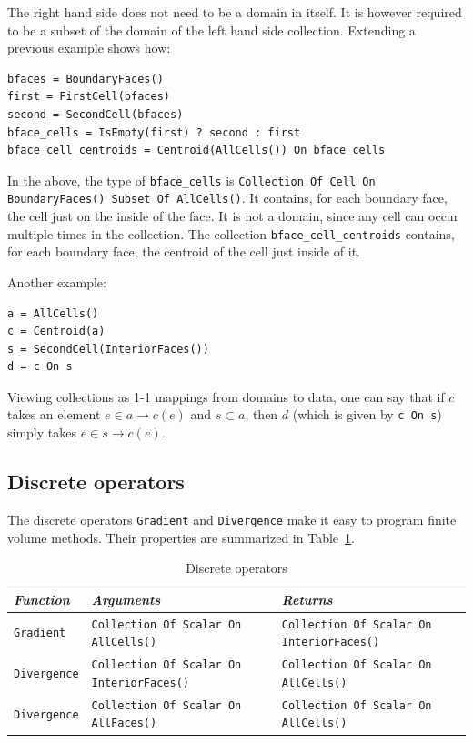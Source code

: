 \documentclass[11pt]{article}
\newcommand{\code}[1]{\texttt{#1}}
\begin{document}
The right hand side does not need to be a domain in itself. It is however required to be a subset of
the domain of the left hand side collection. Extending a previous example shows how:

\begin{verbatim}
bfaces = BoundaryFaces()
first = FirstCell(bfaces)
second = SecondCell(bfaces)
bface_cells = IsEmpty(first) ? second : first
bface_cell_centroids = Centroid(AllCells()) On bface_cells
\end{verbatim}

In the above, the type of \code{bface\_cells} is \code{Collection Of Cell On
  BoundaryFaces() Subset Of AllCells()}. It contains, for each boundary face, the cell
just on the inside of the face. It is not a domain, since any cell can occur multiple
times in the collection. The collection \code{bface\_cell\_centroids} contains, for each
boundary face, the centroid of the cell just inside of it.

Another example:

\begin{verbatim}
a = AllCells()
c = Centroid(a)
s = SecondCell(InteriorFaces())
d = c On s
\end{verbatim}


Viewing collections as 1-1 mappings from domains to data, one can say that if $c$ takes an
element $e \in a \to c(e)$ and $s \subset a$, then $d$ (which is given by \code{c On s})
simply takes $e \in s \to c(e)$.

\subsection{Discrete operators}

The discrete operators \code{Gradient} and \code{Divergence} make it easy to program
finite volume methods. Their properties are summarized in Table~\ref{tab:discops}.

\begin{table}[h]
\begin{tabular}{l|p{4.5cm}|p{4.5cm}}
{\em Function} & {\em Arguments} & {\em Returns} \\
\hline
\code{Gradient} & \code{Collection Of Scalar On AllCells()}
& \code{Collection Of Scalar On InteriorFaces()} \\
\code{Divergence} & \code{Collection Of Scalar On InteriorFaces()}
& \code{Collection Of Scalar On AllCells()} \\
\code{Divergence} & \code{Collection Of Scalar On AllFaces()}
& \code{Collection Of Scalar On AllCells()} \\
\end{tabular}
\caption{Discrete operators}
\label{tab:discops}
\end{table}
\end{document}
